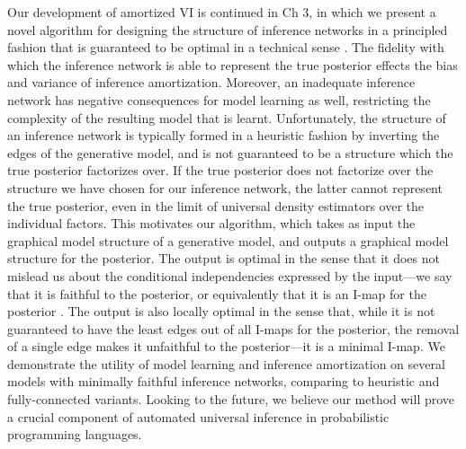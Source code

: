 
Our development of amortized VI is continued in Ch 3, in which we present a novel algorithm for designing the structure of inference networks in a principled fashion that is guaranteed to be optimal in a technical sense \citep{WebbEtAl2018}. The fidelity with which the inference network is able to represent the true posterior effects the bias and variance of inference amortization. Moreover, an inadequate inference network has negative consequences for model learning as well, restricting the complexity of the resulting model that is learnt. Unfortunately, the structure of an inference network is typically formed in a heuristic fashion by inverting the edges of the generative model, and is not guaranteed to be a structure which the true posterior factorizes over. If the true posterior does not factorize over the structure we have chosen for our inference network, the latter cannot represent the true posterior, even in the limit of universal density estimators over the individual factors. This motivates our algorithm, which takes as input the graphical model structure of a generative model, and outputs a graphical model structure for the posterior. The output is optimal in the sense that it does not mislead us about the conditional independencies expressed by the input---we say that it is faithful to the posterior, or equivalently that it is an I-map for the posterior \citep{KollerFriedman2009}. The output is also locally optimal in the sense that, while it is not guaranteed to have the least edges out of all I-maps for the posterior, the removal of a single edge makes it unfaithful to the posterior---it is a minimal I-map. We demonstrate the utility of model learning and inference amortization on several models with minimally faithful inference networks, comparing to heuristic and fully-connected variants. Looking to the future, we believe our method will prove a crucial component of automated universal inference in probabilistic programming languages.

